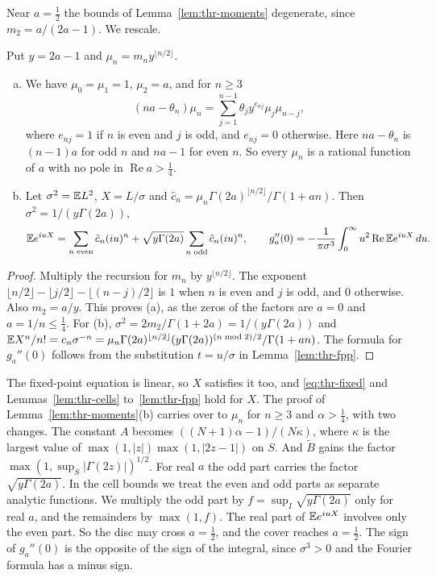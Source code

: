 Near $a=\frac12$ the bounds of Lemma~\ref{lem:thr-moments} degenerate, since
$m_2=a/(2a-1)$. We rescale.

\begin{lemma}\label{lem:thr-scaled}
Put $y=2a-1$ and $\mu_n=m_ny^{\lfloor n/2\rfloor}$.
\begin{enumerate}[(a)]
\item We have $\mu_0=\mu_1=1$, $\mu_2=a$, and for $n\ge3$
\[
 (na-\theta_n)\mu_n=\sum_{j=1}^{n-1}\theta_jy^{e_{nj}}\mu_j\mu_{n-j},
\]
where $e_{nj}=1$ if $n$ is even and $j$ is odd, and $e_{nj}=0$ otherwise.
Here $na-\theta_n$ is $(n-1)a$ for odd $n$ and $na-1$ for even $n$. So every
$\mu_n$ is a rational function of $a$ with no pole in
$\operatorname{Re}a>\frac14$.
\item Let $\sigma^2=\mathbb{E} L^2$, $X=L/\sigma$ and
$\hat c_n=\mu_n\Gamma(2a)^{\lfloor n/2\rfloor}/\Gamma(1+an)$. Then
$\sigma^2=1/(y\Gamma(2a))$,
\[
 \mathbb{E} e^{iuX}=\sum_{n\text{ even}}\hat c_n(iu)^n
 +\sqrt{y\Gamma(2a)}\sum_{n\text{ odd}}\hat c_n(iu)^n,
 \qquad
 g_a''(0)=-\frac1{\pi\sigma^3}\int_0^\infty u^2\operatorname{Re}\mathbb{E} e^{iuX}\,du .
\]
\end{enumerate}
\end{lemma}

\begin{proof}
Multiply the recursion for $m_n$ by $y^{\lfloor n/2\rfloor}$. The exponent
$\lfloor n/2\rfloor-\lfloor j/2\rfloor-\lfloor(n-j)/2\rfloor$ is $1$ when $n$ is
even and $j$ is odd, and $0$ otherwise. Also $m_2=a/y$. This proves (a), as
the zeros of the factors are $a=0$ and $a=1/n\le\frac14$. For (b),
$\sigma^2=2m_2/\Gamma(1+2a)=1/(y\Gamma(2a))$ and
$\mathbb{E} X^n/n!=c_n\sigma^{-n}=\mu_n\Gamma(2a)^{\lfloor n/2\rfloor}
(y\Gamma(2a))^{(n\bmod2)/2}/\Gamma(1+an)$. The formula for $g_a''(0)$ follows
from the substitution $t=u/\sigma$ in Lemma~\ref{lem:thr-fpp}.
\end{proof}

The fixed-point equation is linear, so $X$ satisfies it too, and
\eqref{eq:thr-fixed} and Lemmas~\ref{lem:thr-cells} to~\ref{lem:thr-fpp} hold
for $X$. The proof of Lemma~\ref{lem:thr-moments}(b) carries over to $\mu_n$
for $n\ge3$ and $\alpha>\frac14$, with two changes. The constant $A$ becomes
$((N+1)\alpha-1)/(N\kappa)$, where $\kappa$ is the largest value of
$\max(1,\lvert z\rvert)\max(1,\lvert2z-1\rvert)$ on $S$. And $\tilde B$ gains
the factor $\max(1,\sup_S\lvert\Gamma(2z)\rvert)^{1/2}$. For real $a$ the odd
part carries the factor $\sqrt{y\Gamma(2a)}$. In the cell bounds we treat the
even and odd parts as separate analytic functions. We multiply the odd part
by $f=\sup_I\sqrt{y\Gamma(2a)}$ only for real $a$, and the remainders by
$\max(1,f)$. The real part of $\mathbb{E} e^{iuX}$ involves only the even part. So
the disc may cross $a=\frac12$, and the cover reaches $a=\frac12$. The sign
of $g_a''(0)$ is the opposite of the sign of the integral, since
$\sigma^3>0$ and the Fourier formula has a minus sign.


